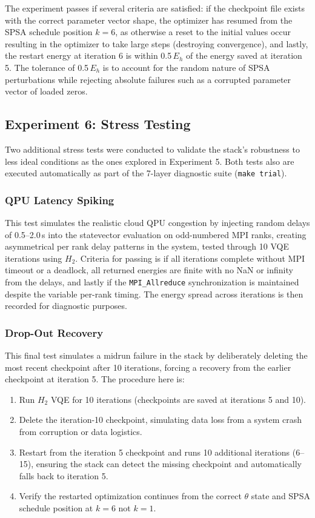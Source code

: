 The experiment passes if several criteria are satisfied: if the checkpoint file exists with the correct parameter vector shape, the optimizer has
resumed from the SPSA schedule position $k=6$, as otherwise a reset to the initial values occur resulting in the optimizer to take large steps (destroying convergence), 
and lastly, the restart energy at iteration 6 is within 0.5\,$E_h$ of the energy saved at iteration 5. 
The tolerance of 0.5\,$E_h$ is to account for the random nature of SPSA perturbations while rejecting absolute failures such as a corrupted parameter vector of loaded zeros.

\subsection{Experiment 6: Stress Testing}
Two additional stress tests were conducted to validate the stack's robustness to less ideal conditions as the ones explored in Experiment 5. 
Both tests also are executed automatically as part of the 7-layer diagnostic suite (\texttt{make trial}).

\subsubsection{QPU Latency Spiking}
This test simulates the realistic cloud QPU congestion by injecting random delays of 0.5--2.0\,s into the statevector 
evaluation on odd-numbered MPI ranks, creating asymmetrical per rank delay patterns in the system, tested through 10 VQE iterations using $H_{2}$.  
Criteria for passing is if all iterations complete without MPI timeout or a deadlock, all returned energies are finite 
with no NaN or infinity from the delays, and lastly if the \texttt{MPI\_Allreduce} synchronization is maintained despite the variable per-rank timing. 
The energy spread across iterations is then recorded for diagnostic purposes. 

\subsubsection{Drop-Out Recovery}
This final test simulates a midrun failure in the stack by deliberately deleting the most recent checkpoint after 10 iterations, 
forcing a recovery from the earlier checkpoint at iteration 5. The procedure here is:
\begin{enumerate}
    \item Run $H_{2}$ VQE for 10 iterations (checkpoints are saved at iterations 5 and 10).
    \item Delete the iteration-10 checkpoint, simulating data loss from a system crash from corruption or data logistics.
    \item Restart from the iteration 5 checkpoint and runs 10 additional iterations (6--15), ensuring the stack can detect the missing checkpoint and automatically falls back to iteration 5.
    \item Verify the restarted optimization continues from the correct $\theta$ state and SPSA schedule position at $k=6$ not $k=1$.
\end{enumerate}

